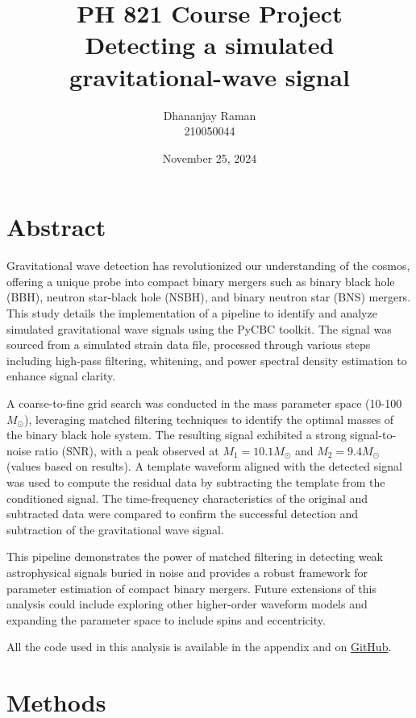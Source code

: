 \documentclass{article}
\begin{document}
\title{PH 821 Course Project \\ Detecting a simulated gravitational-wave signal}
\author{Dhananjay Raman \\ 210050044}
\date{November 25, 2024}
\maketitle
\tableofcontents
\section{Abstract}
Gravitational wave detection has revolutionized our understanding of the cosmos, offering a unique probe into compact binary mergers such as binary black hole (BBH), neutron star-black hole (NSBH), and binary neutron star (BNS) mergers. This study details the implementation of a pipeline to identify and analyze simulated gravitational wave signals using the PyCBC toolkit. The signal was sourced from a simulated strain data file, processed through various steps including high-pass filtering, whitening, and power spectral density estimation to enhance signal clarity.

A coarse-to-fine grid search was conducted in the mass parameter space (10-100 $M_\odot$), leveraging matched filtering techniques to identify the optimal masses of the binary black hole system. The resulting signal exhibited a strong signal-to-noise ratio (SNR), with a peak observed at $M_1 = 10.1 M_\odot$ and $M_2 = 9.4 M_\odot$ (values based on results). A template waveform aligned with the detected signal was used to compute the residual data by subtracting the template from the conditioned signal. The time-frequency characteristics of the original and subtracted data were compared to confirm the successful detection and subtraction of the gravitational wave signal.

This pipeline demonstrates the power of matched filtering in detecting weak astrophysical signals buried in noise and provides a robust framework for parameter estimation of compact binary mergers. Future extensions of this analysis could include exploring other higher-order waveform models and expanding the parameter space to include spins and eccentricity.

All the code used in this analysis is available in the appendix and on \href{https://github.com/DhanoHacks/PH821-Project-Detecting-GWs}{GitHub}.

\section{Methods}
\end{document}
